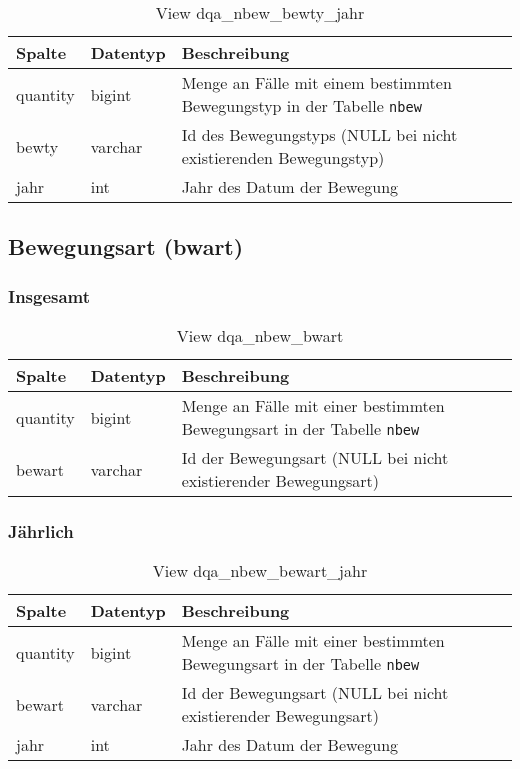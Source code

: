 \begin{table}[ht]
	\centering   
	\caption{View dqa\_nbew\_bewty\_jahr}
	\label{tab:bewBtyJ}
	\begin{tabular}{||l|l|p{10cm}||}   		
		\hline
		Spalte & Datentyp & Beschreibung \\ [0.5ex]
		\hline\hline
		quantity & bigint & Menge an Fälle mit einem bestimmten Bewegungstyp in der Tabelle \texttt{nbew}\\
		\hline
		bewty & varchar & Id des Bewegungstyps (NULL bei nicht existierenden Bewegungstyp)\\
		\hline
		jahr & int &  Jahr des Datum der Bewegung \\
		\hline		
	\end{tabular}
\end{table}

\subsection{Bewegungsart (bwart)} \label{subsec:bewart}

\subsubsection{Insgesamt} \label{subsubsec:bewartI}

\begin{table}[ht]
	\centering   
	\caption{View dqa\_nbew\_bwart}
	\label{tab:bewArtI}
	\begin{tabular}{||l|l|p{10cm}||}   		
		\hline
		Spalte & Datentyp & Beschreibung \\ [0.5ex]
		\hline\hline
		quantity & bigint & Menge an Fälle mit einer bestimmten Bewegungsart in der Tabelle \texttt{nbew} \\
		\hline
		bewart & varchar & Id der Bewegungsart (NULL bei nicht existierender Bewegungsart)\\
		\hline
		
	\end{tabular}
\end{table}


\subsubsection{Jährlich} \label{subsubsec:bewartJ}

\begin{table}[ht]
	\centering   
	\caption{View dqa\_nbew\_bewart\_jahr}
	\label{tab:bewArtJ}
	\begin{tabular}{||l|l|p{10cm}||}   		
		\hline
		Spalte & Datentyp & Beschreibung \\ [0.5ex]
		\hline\hline
		quantity & bigint & Menge an Fälle mit einer bestimmten Bewegungsart in der Tabelle \texttt{nbew}\\
		\hline
		bewart & varchar & Id der Bewegungsart (NULL bei nicht existierender Bewegungsart)\\
		\hline
		jahr & int &  Jahr des Datum der Bewegung \\
		\hline		
	\end{tabular}
\end{table}


